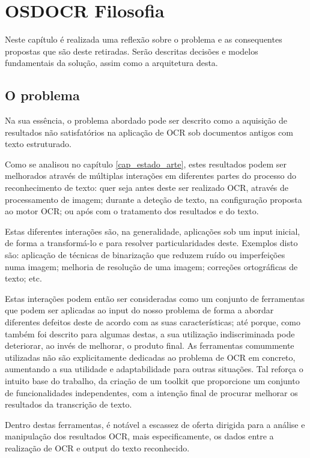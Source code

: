 \chapter{OSDOCR Filosofia}
\label{cap_osdocr_filosofia}

Neste capítulo é realizada uma reflexão sobre o problema e as consequentes propostas que são deste retiradas. Serão descritas decisões e modelos fundamentais da solução, assim como a arquitetura desta. 

\section{O problema}

Na sua essência, o problema abordado pode ser descrito como a aquisição de resultados não satisfatórios na aplicação de OCR sob documentos antigos com texto estruturado. 

Como se analisou no capítulo \ref{cap_estado_arte}, estes resultados podem ser melhorados através de múltiplas interações em diferentes partes do processo do reconhecimento de texto: quer seja antes deste ser realizado OCR, através de processamento de imagem; durante a deteção de texto, na configuração proposta ao motor OCR; ou após com o tratamento dos resultados e do texto.

Estas diferentes interações são, na generalidade, aplicações sob um input inicial, de forma a transformá-lo e para resolver particularidades deste. Exemplos disto são: aplicação de técnicas de binarização que reduzem ruído ou imperfeições numa imagem; melhoria de resolução de uma imagem; correções ortográficas de texto; etc. 

Estas interações podem então ser consideradas como um conjunto de ferramentas que podem ser aplicadas ao input do nosso problema de forma a abordar diferentes defeitos deste de acordo com as suas características; até porque, como também foi descrito para algumas destas, a sua utilização indiscriminada pode deteriorar, ao invés de melhorar, o produto final. As ferramentas comummente utilizadas não são explicitamente dedicadas ao problema de OCR em concreto, aumentando a sua utilidade e adaptabilidade para outras situações.
Tal reforça o intuito base do trabalho, da criação de um toolkit que proporcione um conjunto de funcionalidades independentes, com a intenção final de procurar melhorar os resultados da transcrição de texto.

Dentro destas ferramentas, é notável a escassez de oferta dirigida para a análise e manipulação dos resultados OCR, mais especificamente, os dados entre a realização de OCR e output do texto reconhecido.

